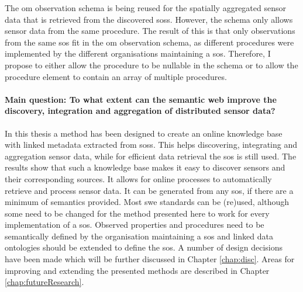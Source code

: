 The \ac{om} observation schema is being reused for the spatially aggregated sensor data that is retrieved from the discovered \aclp{sos}. However, the schema only allows sensor data from the same procedure. The result of this is that only observations from the same \ac{sos} fit in the \ac{om} observation schema, as different procedures were implemented by the different organisations maintaining a \ac{sos}. Therefore, I propose to either allow the procedure to be nullable in the schema or to allow the procedure element to contain an array of multiple procedures.  


\paragraph{\textbf{Main question:} To what extent can the semantic web improve the discovery, integration and aggregation of distributed sensor data?}\mbox{}

In this thesis a method has been designed to create an online knowledge base with linked metadata extracted from \aclp{sos}. This helps discovering, integrating and aggregation sensor data, while for efficient data retrieval the \ac{sos} is still used. The results show that such a knowledge base makes it easy to discover sensors and their corresponding sources. It allows for online processes to automatically retrieve and process sensor data. It can be generated from any \ac{sos}, if there are a minimum of semantics provided. Most \ac{swe} standards can be (re)used, although some need to be changed for the method presented here to work for every implementation of a \ac{sos}. Observed properties and procedures need to be semantically defined by the organisation maintaining a \ac{sos} and linked data ontologies should be extended to define the \acl{sos}. A number of design decisions have been made which will be further discussed in Chapter \ref{chap:disc}. Areas for improving and extending the presented methods are described in Chapter \ref{chap:futureResearch}.
